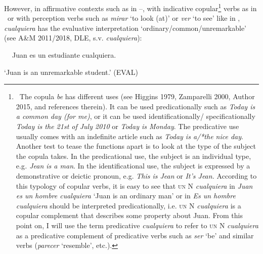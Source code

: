 \begin{styleStandard}
However, in affirmative contexts such as in –, with indicative copular\footnote{\textrm{\ The copula }\textrm{\textit{be}}\textrm{ has different uses (see Higgins 1979, Zamparelli 2000, Author 2015, and references therein). It can be used predicationally such as }\textrm{\textit{Today is a common day (for me)}}\textrm{, or it can be used identificationally/ specificationally }\textrm{\textit{Today is the 21st of July 2010 }}\textrm{or}\textrm{\textit{ Today is Monday}}\textrm{. The predicative use usually comes with an indefinite article such as }\textrm{\textit{Today is a/*the nice day}}\textrm{. Another test to tease the functions apart is to look at the type of the subject the copula takes. In the predicational use, the subject is an individual type, e.g}\textrm{\textit{. Jean is a man}}\textrm{. In the identificational use, the subject is expressed by a demonstrative or deictic pronoun, e.g. }\textrm{\textit{This is Jean }}\textrm{or}\textrm{\textit{ It’s Jean.}}\textrm{ According to this typology of copular verbs, it is easy to see that }\textsc{un}\textrm{ N}\textrm{\textit{ cualquiera}}\textrm{ in }\textrm{\textit{Juan es un hombre cualquiera}}\textrm{ ‘Juan is an ordinary man’ or in }\textrm{\textit{Es un hombre cualquiera}}\textrm{ should be interpreted predicationally, i.e. }\textsc{un}\textrm{ N}\textrm{\textit{ cualquiera}}\textrm{ is a copular complement that describes some property about Juan. From this point on, I will use the term predicative }\textrm{\textit{cualquiera}}\textrm{ to refer to }\textsc{un}\textrm{ N }\textrm{\textit{cualquiera}}\textrm{ as a predicative complement of predicative verbs such as }\textrm{\textit{ser}}\textrm{ ‘be’ and similar verbs (}\textrm{\textit{parecer}}\textrm{ ‘resemble’, etc.). }} verbs as in \ or with perception verbs such as \textit{mirar }‘to look (at)’ or \textit{ver} ‘to see’ like in , \textit{cualquiera} has the evaluative interpretation ‘ordinary/common/unremarkable’ (see A\&M 2011/2018, DLE, s.v. \textit{cualquiera}):
\end{styleStandard}

\begin{styleStandard}
\label{bkm:Ref533761081}\textbf{\ \ }Juan es un estudiante cualquiera. 
\end{styleStandard}

\begin{styleStandard}
‘Juan is an unremarkable student.’ (EVAL)
\end{styleStandard}

